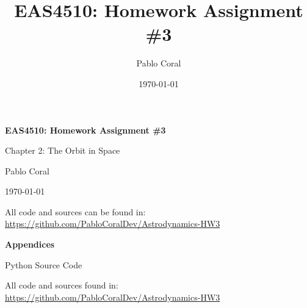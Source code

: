 \documentclass[11pt]{article}
\title{EAS4510: Homework Assignment \#3}
\author{Pablo Coral}
\date{\today}
\newcommand{\dividerpage}[3]{%
    \clearpage
    \thispagestyle{empty}
    \begin{center}
        \vspace*{\fill}
        {\Huge\bfseries #1\par}
        \vspace{1cm}
        {\Large #2\par}
        \vspace{1.5cm}
        {\normalsize #3\par}
        \vspace*{\fill}
    \end{center}
    \clearpage
}
\newcommand{\repolink}{\url{https://github.com/PabloCoralDev/Astrodynamics-HW3}}
\begin{document}
\begin{titlepage}
    \centering
    \vspace*{4cm}
    {\LARGE\bfseries EAS4510: Homework Assignment \#3\par}
    \vspace{0.8cm}
    {\Large Chapter 2: The Orbit in Space\par}
    \vspace{1.5cm}
    {\Large Pablo Coral\par}
    \vspace{0.5cm}
    {\large \today\par}
    \vspace{1cm}
    {\normalsize All code and sources can be found in: \repolink\par}
    \vfill
\end{titlepage}
\clearpage
{}
\setcounter{page}{1}












\dividerpage{Appendices}{Python Source Code}{All code and sources found in: \repolink}
\appendix

\end{document}
